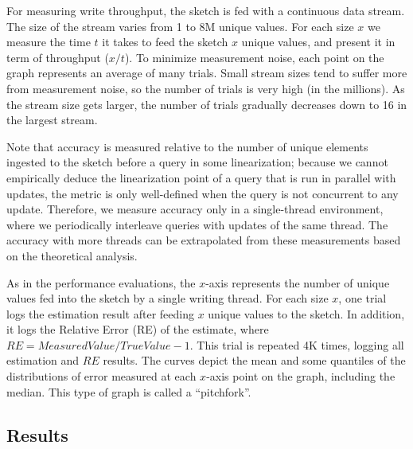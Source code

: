 For measuring write throughput, the sketch is fed with a continuous data stream. The size of
the stream varies from 1 to 8M unique values. For each size $x$ we measure the time $t$ it takes to feed the
sketch $x$ unique values, and present it in term of throughput ($x/t$).
To minimize measurement noise, each point on the graph represents an average of
many trials. Small stream sizes tend to suffer more from measurement noise, so
the number of trials is very high (in the millions). As the stream size gets larger,
the number of trials gradually decreases down to 16 in the largest stream.

Note that accuracy is measured relative to the number of unique elements ingested to the
sketch before a query in some linearization; because we cannot empirically deduce the
linearization point of a query that is run in parallel with updates, the metric is only
well-defined when the query is not concurrent to any update. Therefore, we measure
accuracy only in a single-thread environment, where we periodically interleave queries
with updates of the same thread. The accuracy with more threads can be extrapolated
from these measurements based on the theoretical analysis.

As in the performance evaluations, the $x$-axis represents the number of unique values fed into the sketch
by a single writing thread. For each size $x$, one trial logs the estimation result after feeding $x$
unique values to the sketch. In addition, it logs the Relative Error (RE) of the estimate, where
$\mathit{RE} = \mathit{MeasuredValue}/\mathit{TrueValue} - 1$. This trial is repeated 4K times,
logging all estimation and $\mathit{RE}$ results. The curves depict the mean and some
quantiles of the distributions of error measured at each $x$-axis point on the graph, including the median. 
This type of graph is called a ``pitchfork''.


\subsection{Results}
\label{fc-ssec:results}

